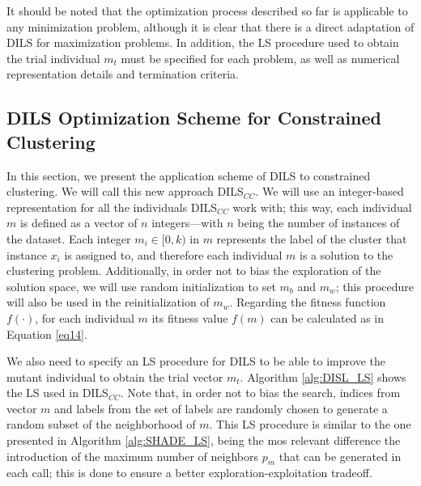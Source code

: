 It should be noted that the optimization process described so far is applicable to any minimization problem, although it is clear that there is a direct adaptation of \acs{DILS} for maximization problems. In addition, the \acs{LS} procedure used to obtain the trial individual $m_t$ must be specified for each problem, as well as numerical representation details and termination criteria.

\subsection[\acsfont{DILS} Optimization Scheme for Constrained Clustering]{DILS Optimization Scheme for Constrained Clustering} \label{sec:DILS_CC}

In this section, we present the application scheme of \acs{DILS} to constrained clustering. We will call this new approach \acs{DILS}$_{CC}$. We will use an integer-based representation for all the individuals \acs{DILS}$_{CC}$ work with; this way, each individual $m$ is defined as a vector of $n$ integers---with $n$ being the number of instances of the dataset. Each integer $m_i \in [0,k)$ in $m$ represents the label of the cluster that instance $x_i$ is assigned to, and therefore each individual $m$ is a solution to the clustering problem. Additionally, in order not to bias the exploration of the solution space, we will use random initialization to set $m_b$ and $m_w$; this procedure will also be used in the reinitialization of $m_w$. Regarding the fitness function $f(\cdot)$, for each individual $m$ its fitness value $f(m)$ can be calculated as in Equation \ref{eq14}.

We also need to specify an \acs{LS} procedure for \acs{DILS} to be able to improve the mutant individual to obtain the trial vector $m_t$. Algorithm \ref{alg:DISL_LS} shows the \acs{LS} used in \acs{DILS}$_{CC}$. Note that, in order not to bias the search, indices from vector $m$ and labels from the set of labels are randomly chosen to generate a random subset of the neighborhood of $m$. This \acs{LS} procedure is similar to the one presented in Algorithm \ref{alg:SHADE_LS}, being the mos relevant difference the introduction of the maximum number of neighbors $p_m$ that can be generated in each call; this is done to ensure a better exploration-exploitation tradeoff. 

